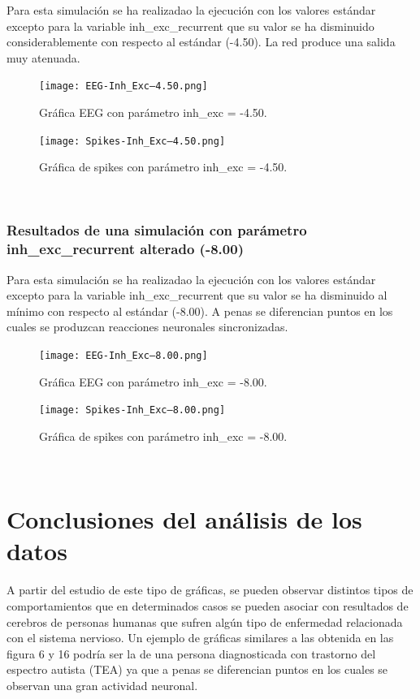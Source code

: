 \documentclass[oneside,openright,titlepage,numbers=noenddot,openany,headinclude,footinclude=true,
cleardoublepage=empty,abstractoff,BCOR=5mm,paper=a4,fontsize=12pt,main=spanish]{scrreprt}
\begin{document}
Para esta simulación se ha realizadao la ejecución con los valores estándar excepto para la variable inh\_exc\_recurrent que su valor se ha disminuido considerablemente con respecto al estándar (-4.50). La red produce una salida muy atenuada.

\begin{figure}[htb]
	\centering
	\texttt{[image: EEG-Inh\_Exc--4.50.png]}
	\caption{Gráfica EEG con parámetro inh\_exc = -4.50.}
\end{figure}

\begin{figure}[htb]
	\centering
	\texttt{[image: Spikes-Inh\_Exc--4.50.png]}
	\caption{Gráfica de spikes con parámetro inh\_exc = -4.50.}
\end{figure}\


\newpage
\subsection{Resultados de una simulación con parámetro inh\_exc\_recurrent alterado (-8.00)}

Para esta simulación se ha realizadao la ejecución con los valores estándar excepto para la variable inh\_exc\_recurrent que su valor se ha disminuido al mínimo con respecto al estándar (-8.00). A penas se diferencian puntos en los cuales se produzcan reacciones neuronales sincronizadas.

\begin{figure}[htb]
	\centering
	\texttt{[image: EEG-Inh\_Exc--8.00.png]}
	\caption{Gráfica EEG con parámetro inh\_exc = -8.00.}
\end{figure}

\begin{figure}[htb]
	\centering
	\texttt{[image: Spikes-Inh\_Exc--8.00.png]}
	\caption{Gráfica de spikes con parámetro inh\_exc = -8.00.}
\end{figure}\

\newpage

\chapter{Conclusiones del análisis de los datos}

A partir del estudio de este tipo de gráficas, se pueden observar distintos tipos de comportamientos que en determinados casos se pueden asociar con resultados de cerebros de personas humanas que sufren algún tipo de enfermedad relacionada con el sistema nervioso. Un ejemplo de gráficas similares a las obtenida en las figura 6 y 16 podría ser la de una persona diagnosticada con trastorno del espectro autista (TEA) ya que a penas se diferencian puntos en los cuales se observan una gran actividad neuronal. 
\end{document}
